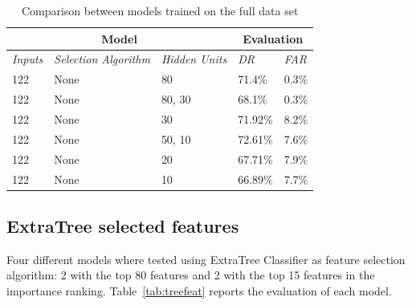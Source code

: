 \begin{table}[h]
\center
\begin{tabular}{|l|l|l||l|l|}
\hline
\multicolumn{3}{|c||}{\textbf{Model}}                                   & \multicolumn{2}{c|}{\textbf{Evaluation}} \\ \hline
\textit{Inputs} & \textit{Selection Algorithm} & \textit{Hidden Units} & \textit{DR}    & \textit{FAR}    \\ \hline
122             & None                         & 80                    &   71.4\%                  &    0.3\%                \\ \hline
122             & None                         & 80, 30                &   68.1\%                 &     0.3\%               \\ \hline
122             & None                         & 30                    &  71.92\%                   &  8.2\%                  \\ \hline
122             & None                         & 50, 10                &   72.61\%                   &   7.6\%                   \\ \hline
122             & None                         & 20                &    67.71\%                 &       7.9\%             \\ \hline
122             & None                         & 10                &    66.89\%                 &     7.7\%               \\ \hline
\end{tabular}
\caption{Comparison between models trained on the full data set}
\label{tab:allfeat}
\end{table}


\subsection{ExtraTree selected features}

Four different models where tested using ExtraTree Classifier as feature selection algorithm: 2 with the top 80 features and 2 with the top 15 features in the importance ranking. Table~\ref{tab:treefeat} reports the evaluation of each model.



